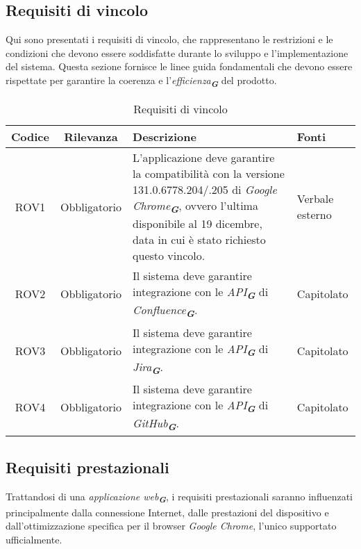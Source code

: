 \subsection{Requisiti di vincolo}
\label{sec:req_vincolo}
Qui sono presentati i requisiti di vincolo, che rappresentano le restrizioni e le condizioni
che devono essere soddisfatte durante lo sviluppo e l'implementazione del sistema. Questa
sezione fornisce le linee guida fondamentali che devono essere rispettate per garantire la
coerenza e l'\emph{efficienza}\textsubscript{\textit{\textbf{G}}} del prodotto.
\begin{table}[h!]
    \centering
    \renewcommand{\arraystretch}{1.6} %
    \begin{tabularx}{\textwidth}{|>{\centering\arraybackslash}c|>{\centering\arraybackslash}c|>{\centering\arraybackslash}X|>{\centering\arraybackslash}p{3cm}|} \hline
    \rowcolor[HTML]{FFD700} 
    \textbf{Codice} & \textbf{Rilevanza} & \textbf{Descrizione} & \textbf{Fonti} \\ \hline
	ROV1 & Obbligatorio & L'applicazione deve garantire la compatibilità con la versione 131.0.6778.204/.205 di \emph{Google Chrome}\textsubscript{\textit{\textbf{G}}}, ovvero l'ultima disponibile al 19 dicembre, data in cui è stato richiesto questo vincolo. & Verbale esterno \\ \hline
    ROV2 & Obbligatorio & Il sistema deve garantire integrazione con le \emph{API}\textsubscript{\textit{\textbf{G}}} di \emph{Confluence}\textsubscript{\textit{\textbf{G}}}. & Capitolato \\ \hline
    ROV3 & Obbligatorio & Il sistema deve garantire integrazione con le \emph{API}\textsubscript{\textit{\textbf{G}}} di \emph{Jira}\textsubscript{\textit{\textbf{G}}}. & Capitolato \\ \hline
    ROV4 & Obbligatorio & Il sistema deve garantire integrazione con le \emph{API}\textsubscript{\textit{\textbf{G}}} di \emph{GitHub}\textsubscript{\textit{\textbf{G}}}. & Capitolato \\ \hline
    \end{tabularx}
    \caption{Requisiti di vincolo}
    \label{tab:Requisiti_di_vincolo}
\end{table}

\subsection{Requisiti prestazionali}
\label{sec:req_prestazionali}
Trattandosi di una \emph{applicazione web}\textsubscript{\textit{\textbf{G}}}, i requisiti prestazionali saranno influenzati principalmente dalla connessione Internet, 
dalle prestazioni del dispositivo e dall'ottimizzazione specifica per il browser \emph{Google Chrome}, l'unico supportato ufficialmente.

